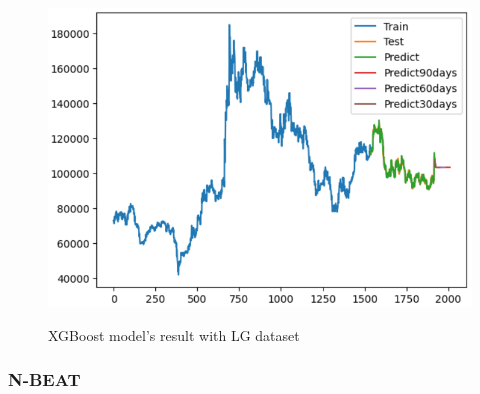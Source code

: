 \documentclass[conference]{IEEEtran}
\begin{document}
\begin{figure}[H]
\begin{minipage}{0.15\textwidth}
    \label{fig:2}
    \end{minipage}%
    \begin{minipage}{0.15\textwidth}
    \centering
    \includegraphics[width=1\textwidth]{Image/XGBoost/XGBoost_LG_8_2.png}

    \label{fig:3}
    \end{minipage}
    \caption{ XGBoost model's result with LG dataset }
\end{figure}


\subsubsection{N-BEAT}
\end{document}
